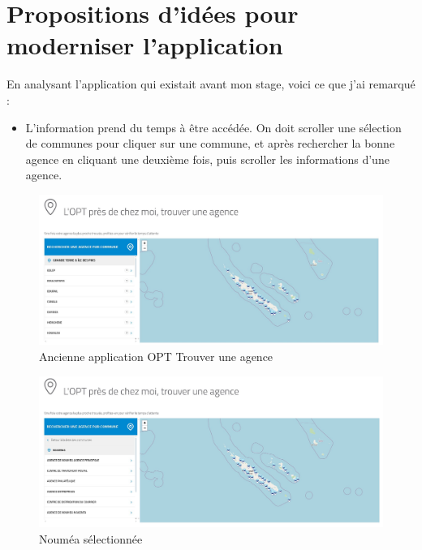 \documentclass[12pt,a4paper]{report}
\begin{document}
\section{Propositions d'idées pour moderniser l'application}
En analysant l'application qui existait avant mon stage, voici ce que j'ai remarqué :
\begin{itemize}
    \item L'information prend du temps à être accédée. On doit scroller une sélection de communes pour cliquer sur une commune, et après rechercher la bonne agence en cliquant une deuxième fois, puis scroller les informations d'une agence.
\end{itemize}
\begin{figure}[h] %
    \centering
    \includegraphics[width=1\textwidth]{ressources_rapport/ancien_app_opt.JPG}
    \caption{Ancienne application OPT Trouver une agence}
\end{figure}
\vspace{1cm}

\begin{figure}[h] %
    \centering
    \includegraphics[width=1\textwidth]{ressources_rapport/ancien_app_opt_noumea.JPG}
    \caption{Nouméa sélectionnée}
\end{figure}
\vspace{1cm}
\end{document}
